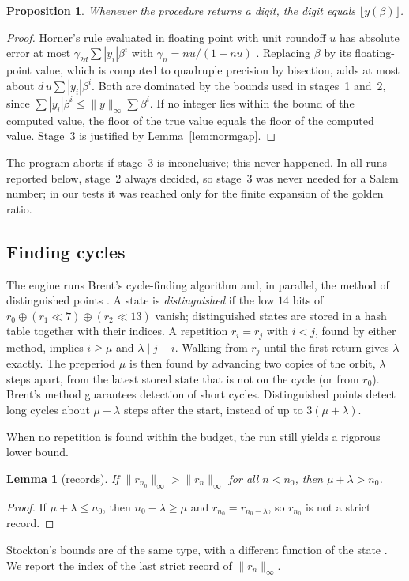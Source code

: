 \documentclass[11pt]{amsart}
\newtheorem{proposition}[theorem]{Proposition}
\newtheorem{lemma}[theorem]{Lemma}
\theoremstyle{definition}
\theoremstyle{remark}
\begin{document}
\begin{proposition}\label{prop:digit}
Whenever the procedure returns a digit, the digit equals $\lfloor y(\beta)\rfloor$.
\end{proposition}
\begin{proof}
Horner's rule evaluated in floating point with unit roundoff $u$ has absolute error at most $\gamma_{2d}\sum|y_i|\beta^i$ with $\gamma_n=nu/(1-nu)$ \cite[Sec.~5.1]{Higham}. Replacing $\beta$ by its floating-point value, which is computed to quadruple precision by bisection, adds at most about $d\,u\sum|y_i|\beta^i$. Both are dominated by the bounds used in stages~1 and~2, since $\sum|y_i|\beta^i\le\|y\|_\infty\sum\beta^i$. If no integer lies within the bound of the computed value, the floor of the true value equals the floor of the computed value. Stage~3 is justified by Lemma~\ref{lem:normgap}.
\end{proof}

The program aborts if stage~3 is inconclusive; this never happened. In all runs reported below, stage~2 always decided, so stage~3 was never needed for a Salem number; in our tests it was reached only for the finite expansion of the golden ratio.

\subsection{Finding cycles}
The engine runs Brent's cycle-finding algorithm \cite{Brent} and, in parallel, the method of distinguished points \cite{vOW}. A state is \emph{distinguished} if the low $14$ bits of $r_0\oplus(r_1\ll7)\oplus(r_2\ll13)$ vanish; distinguished states are stored in a hash table together with their indices. A repetition $r_i=r_j$ with $i<j$, found by either method, implies $i\ge\mu$ and $\lambda\mid j-i$. Walking from $r_j$ until the first return gives $\lambda$ exactly. The preperiod $\mu$ is then found by advancing two copies of the orbit, $\lambda$ steps apart, from the latest stored state that is not on the cycle (or from $r_0$). Brent's method guarantees detection of short cycles. Distinguished points detect long cycles about $\mu+\lambda$ steps after the start, instead of up to $3(\mu+\lambda)$.

When no repetition is found within the budget, the run still yields a rigorous lower bound.
\begin{lemma}[records]\label{lem:records}
If $\|r_{n_0}\|_\infty>\|r_n\|_\infty$ for all $n<n_0$, then $\mu+\lambda>n_0$.
\end{lemma}
\begin{proof}
If $\mu+\lambda\le n_0$, then $n_0-\lambda\ge\mu$ and $r_{n_0}=r_{n_0-\lambda}$, so $r_{n_0}$ is not a strict record.
\end{proof}
Stockton's bounds are of the same type, with a different function of the state \cite[Sec.~6.1]{Stockton}. We report the index of the last strict record of $\|r_n\|_\infty$.
\end{document}

